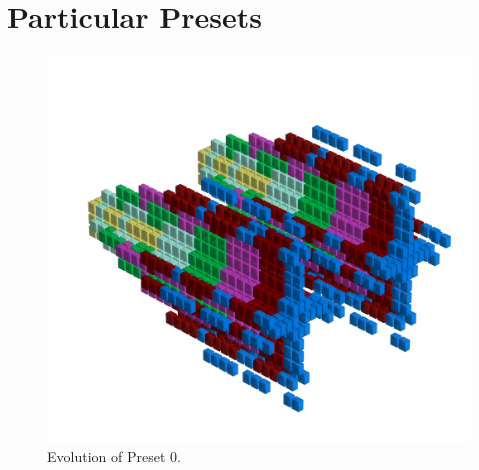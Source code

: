 \chapter{Particular Presets} 
\lstset{style=6502Style}

\clearpage                                                                 
\begin{figure}[H]                                                          
    \centering                                                             
    \begin{adjustbox}{width=14cm,center}                                   
      \includegraphics[width=14cm]{src/presets/pattern0-45.png}%
    \end{adjustbox}                                                        
\caption{Evolution of Preset 0.}                                           
\end{figure}                                                               
\clearpage                                                                 
                                                                           

